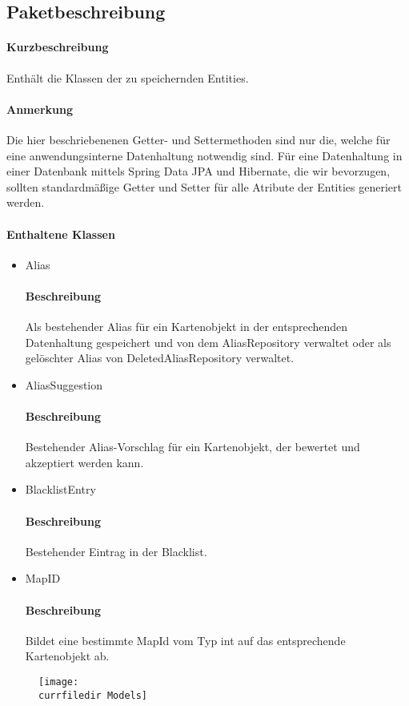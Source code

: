 \subsection*{Paketbeschreibung}%
\paragraph*{Kurzbeschreibung}
    Enthält die Klassen der zu speichernden Entities.
\paragraph*{Anmerkung}  
    Die hier beschriebenenen Getter- und Settermethoden sind nur die, welche für eine anwendungsinterne Datenhaltung 
    notwendig sind. Für eine Datenhaltung in einer Datenbank mittels Spring Data JPA und Hibernate, die wir bevorzugen, sollten 
    standardmäßige Getter und Setter für alle Atribute der Entities generiert werden.
\paragraph*{Enthaltene Klassen}
\begin{itemize}
    \item Alias
    		\paragraph*{Beschreibung}
            Als bestehender Alias für ein Kartenobjekt in der entsprechenden Datenhaltung gespeichert und von 
            dem AliasRepository verwaltet oder als gelöschter Alias von DeletedAliasRepository verwaltet.
    \item AliasSuggestion
    		\paragraph*{Beschreibung}
          Bestehender Alias-Vorschlag für ein Kartenobjekt, der bewertet und akzeptiert werden kann.
    \item BlacklistEntry 
            \paragraph{Beschreibung}
          Bestehender Eintrag in der Blacklist.
    \item MapID
            \paragraph{Beschreibung} 
          Bildet eine bestimmte MapId vom Typ int auf das entsprechende Kartenobjekt ab.
\end{itemize}

\begin{figure}
  \centering
  \texttt{[image: \\currfiledir Models]}
\end{figure}